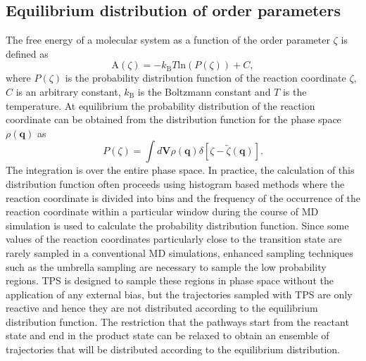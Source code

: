 \documentclass[journal=jpcbfk,manuscript=article,layout=traditional]{achemso}
\begin{document}
\subsection{Equilibrium distribution of order parameters}
The free energy of a molecular system as a function of the order parameter $\zeta$ 
is defined as 
\begin{equation}
\text{A}(\zeta) = -k_{\text{B}}T\text{ln}(P(\zeta)) + C, \label{eqn:fenergy}
\end{equation}
where $P(\zeta)$ is the probability distribution function of the reaction coordinate
$\zeta$, $C$ is an arbitrary constant, $k_{\text{B}}$ is the Boltzmann constant
and $T$ is the temperature. At equilibrium the probability distribution of the 
reaction coordinate can be obtained from the distribution function for the phase 
space $\rho(\textbf{q})$ as
\begin{equation}
P(\zeta) = \int d\textbf{V} \rho(\textbf{q})\delta\left[\zeta-\tilde{\zeta}(\textbf{q})\right].
\end{equation}
The integration is over the entire phase space. In practice, the calculation of this distribution function
often proceeds using histogram based methods where the reaction coordinate is 
divided into bins and the frequency of the occurrence of the reaction coordinate 
within a particular window during the course of MD simulation is used to calculate 
the probability distribution function. Since some values of the reaction coordinates 
particularly close to the transition state are 
rarely sampled in a conventional MD simulations, enhanced sampling techniques such as the umbrella sampling
are necessary to sample the low probability regions. TPS is designed to sample these regions in phase space 
without the application of any external bias, but the trajectories 
sampled with TPS are only reactive and hence
they are not distributed according to the equilibrium distribution function. 
The restriction that the pathways start from the reactant state and end in the 
product state can be relaxed to obtain an ensemble of trajectories that will 
be distributed according to the equilibrium distribution. 
\end{document}
